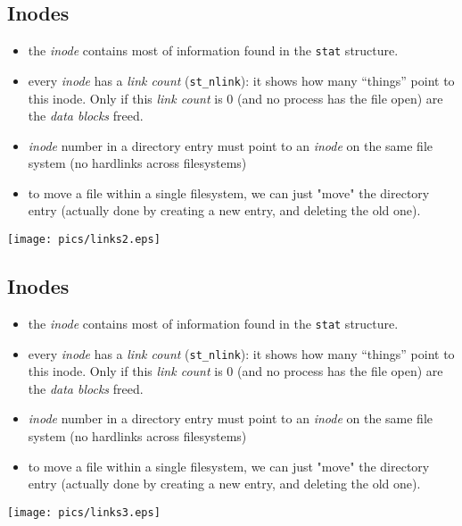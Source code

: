 \documentclass[xga]{xdvislides}
\begin{document}
\subsection{Inodes}
\begin{itemize}
	\item the {\em inode} contains most of information found in the {\tt stat}
		structure.
	\item every {\em inode} has a {\em link count} ({\tt st\_nlink}):  it
		shows how many ``things'' point to this inode.  Only if this
		{\em link count} is 0 (and no process has the file open) are the
		{\em data blocks} freed.
	\item {\em inode} number in a directory entry must point to an {\em inode}
		on the same file system (no hardlinks across filesystems)
	\item to move a file within a single filesystem, we can just "move" the
		directory entry (actually done by creating a new entry, and deleting
		the old one).
\end{itemize}
\texttt{[image: pics/links2.eps]}

\subsection{Inodes}
\begin{itemize}
	\item the {\em inode} contains most of information found in the {\tt stat}
		structure.
	\item every {\em inode} has a {\em link count} ({\tt st\_nlink}):  it
		shows how many ``things'' point to this inode.  Only if this
		{\em link count} is 0 (and no process has the file open) are the
		{\em data blocks} freed.
	\item {\em inode} number in a directory entry must point to an {\em inode}
		on the same file system (no hardlinks across filesystems)
	\item to move a file within a single filesystem, we can just "move" the
		directory entry (actually done by creating a new entry, and deleting
		the old one).
\end{itemize}
\texttt{[image: pics/links3.eps]}
\end{document}
